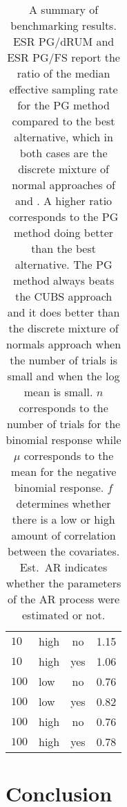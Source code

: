 \documentclass[11pt]{article}
\begin{document}
\begin{table}
\begin{tabular}{l l c c}
$10$ & high & no & 1.15 \\
$10$ & high & yes & 1.06 \\

$100$ & low & no & 0.76 \\
$100$ & low & yes & 0.82 \\

$100$ & high & no & 0.76 \\
$100$ & high & yes & 0.78 \\

\end{tabular}

\caption{\label{tab:benchmark-summary} A summary of benchmarking results. ESR
  PG/dRUM 
  and ESR PG/FS report the ratio of
  the median effective sampling rate for the PG method compared to the best
  alternative, which in both cases are the discrete mixture of normal approaches
  of \cite{fussl-etal-2013} and \cite{fruhwirth-schnatter-etal-2009}.  A higher
  ratio corresponds to the PG method doing better than the best alternative.  The
  PG method always beats the CUBS approach and it does better than the discrete
  mixture of normals approach when the number of trials is small and when the log
  mean is small.  $n$ corresponds to the number of trials for the binomial
  response while $\mu$ corresponds to the mean for the negative binomial
  response.  $f$ determines whether there is a low or high amount of correlation
  between the covariates.  Est.\ AR indicates whether the parameters of the AR
  process were estimated or not.
}
\end{table}



\section{Conclusion}
\end{document}
